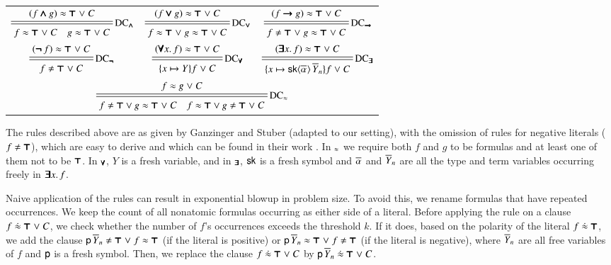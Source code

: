\vspace{2\jot}
\begin{tabular}{ccc}
  $\namedsimp{DC$_{\iand}$}
  { (f \iand g) \eq \itrue \llor C}
  { f \eq \itrue \llor C \quad g \eq \itrue \llor C }$ &
  $\namedsimp{DC$_{\ior}$}
  { (f \ior g) \eq \itrue \llor C}
  { f \eq \itrue \llor g \eq \itrue  \llor C }$ &
  $\namedsimp{DC$_{\iimplies}$}
  { (f \iimplies g) \eq \itrue \llor C}
  { f \not\eq \itrue \llor g \eq \itrue  \llor C } $ \\[2\jot]
  $\namedsimp{DC$_{\inot}$}
  { (\inot f) \eq \itrue \llor C}
  { f \not\eq \itrue \llor C}$ &
  $\namedsimp{DC$_{\iforall}$}
  { (\iforall x. \, f) \eq \itrue \llor C}
  { \{x \mapsto Y\}f \llor C }$ &
  $\namedsimp{DC$_{\iexists}$}
  { (\iexists x.\, f) \eq \itrue \llor C}
  { \{x \mapsto \cst{sk}\typeargs{\tuple{\alpha}{}} \, \tuplen{Y} \}f \llor C }$ 
  \\[2\jot]
  \multicolumn{3}{c}{$\namedsimp{DC$_\eq$}
  { f \eq g \llor C}
  { f \not\eq \itrue \lor g\eq\itrue \llor C \quad f \eq \itrue \lor g\not\eq\itrue \llor C}$}
\end{tabular}
\vspace{2\jot}

The rules described above are as given by Ganzinger and Stuber (adapted to
our setting), with the omission of rules for negative literals ($ f \not\eq
\itrue$), which are easy to derive and which can be found in their work \cite{gs-05-boolsup}.
In $_\approx$ we require both $f$ and $g$ to be formulas and at least one of
them not to be $\pmb{\top}$. In $_{\pmb{\forall}}$, $Y$ is a fresh variable, and in
$_{\pmb{\exists}}$, $\mathsf{sk}$ is a fresh symbol and $\overline{\alpha}_{}$ and $\overline{Y}_{n}$ are all the type and term variables occurring
freely in $\pmb{\exists} x.\, f$.

Naive application of the  rules can result in exponential blowup in
problem size. To avoid this, we rename formulas that have repeated
occurrences. We keep the count of all nonatomic formulas occurring as
either side of a literal. Before applying the  rule on a
clause $f \mathrel{\dot{\approx}} \pmb{\top} \mathrel\lor C $, we check whether the number of $f$'s
occurrences exceeds the threshold $k$. If it does, based on the
polarity of the literal $f \mathrel{\dot{\approx}} \pmb{\top}$, we add the clause $\cst{p} \, \tuplen{Y}
\not\eq \itrue \llor f \eq \itrue$ (if the literal is positive) or $\cst{p} \, \tuplen{Y}
\eq \itrue \llor f \not\eq \itrue$ (if the literal is negative), where $\overline{Y}_{n}$ are
all free variables of $f$ and $\mathsf{p}$ is a fresh symbol. Then, we replace the
clause $f \mathrel{\dot{\approx}} \pmb{\top} \mathrel\lor C$ by $ \mathsf{p} \, \overline{Y}_{n} \mathrel{\dot{\approx}} \pmb{\top} \mathrel\lor
C$.


